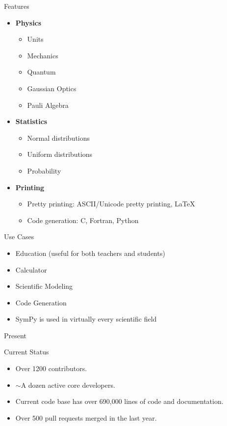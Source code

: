 \documentclass[xcolor=svgnames]{beamer}
\begin{document}
\begin{frame}{Features}
\begin{multicols}{2}
\begin{itemize}
    \item \textbf{Physics}
      \begin{itemize}
        \tiny
      \item Units
      \item Mechanics
      \item Quantum
      \item Gaussian Optics
      \item Pauli Algebra
      \end{itemize}

    \item \textbf{Statistics}
      \begin{itemize}
        \tiny
      \item Normal distributions
      \item Uniform distributions
      \item Probability
      \end{itemize}

    \item \textbf{Printing}
      \begin{itemize}
        \tiny
      \item Pretty printing: ASCII/Unicode pretty printing, LaTeX
      \item Code generation: C, Fortran, Python
      \end{itemize}
    \end{itemize}
  \end{multicols}
\end{frame}

\begin{frame}{Use Cases}
  \begin{block}{}
    \begin{itemize}
      \item Education (useful for both teachers and students)
      \item Calculator
      \item Scientific Modeling
      \item Code Generation
      \item SymPy is used in virtually every scientific field
    \end{itemize}
  \end{block}
\end{frame}

\begin{frame}{Present}
  \begin{block}{Current Status}
    \begin{itemize}
    \item Over 1200 contributors.
    \item $\sim$A dozen active core developers.
    \item Current code base has over 690,000 lines of code and documentation.
    \item Over 500 pull requests merged in the last year.
    \end{itemize}
  \end{block}
\end{frame}
\end{document}
